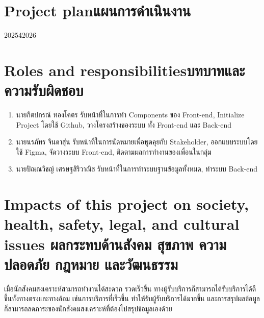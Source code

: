 
\section{\ifenglish Project plan\else แผนการดำเนินงาน\fi}

\begin{plan}{1}{2025}{4}{2026}
\end{plan}

\newpage

\section{\ifenglish Roles and responsibilities\else บทบาทและความรับผิดชอบ\fi}
\begin{enumerate}
\item นายกิตปกรณ์ ทองโคตร รับหน้าที่ในการทำ Components ของ Front-end, Initialize Project โดยใช้ Github, วางโครงสร้างของระบบ ทั้ง Front-end และ Back-end
\item นายนรภัทร จินดาสุ่น รับหน้าที่ในการนัดหมายเพื่อพูดคุยกับ Stakeholder, ออกแบบระบบโดยใช้ Figma, จัดวางระบบ Front-end, ติดตามผลการทำงานของเพื่อนในกลุ่ม
\item นายปัณณวิชญ์ เศรษฐสิริวาณิช รับหน้าที่ในการทำระบบฐานข้อมูลทั้งหมด, ทำระบบ Back-end
\end{enumerate}

\section{\ifenglish%
Impacts of this project on society, health, safety, legal, and cultural issues
\else%
ผลกระทบด้านสังคม สุขภาพ ความปลอดภัย กฎหมาย และวัฒนธรรม
\fi}

เมื่อนักสังคมสงเคราะห์สามารถทำงานได้สะดวก รวดเร็วขึ้น ทางผู้รับบริการก็สามารถได้รับบริการได้ดีขึ้นทั้งทางตรงและทางอ้อม เช่นการบริการที่เร็วขึ้น ทำให้รับผู้รับบริการได้มากขึ้น และการสรุปผลข้อมูลก็สามารถลดภาระของนักสังคมสงเคราะห์ที่ต้องไปสรุปข้อมูลเองด้วย
